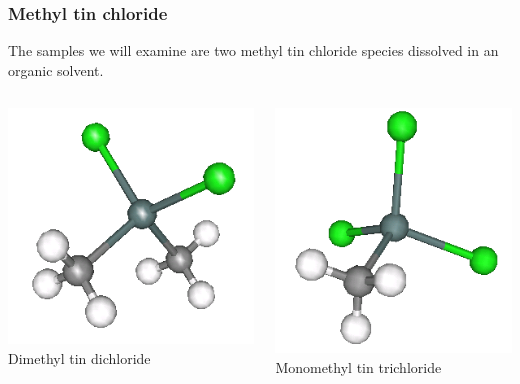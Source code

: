 \documentclass[10pt, xcolor=x11names, compress]{beamer}
\begin{document}
\begin{frame}
  \frametitle{Methyl tin chloride}
  The samples we will examine are two methyl tin chloride species
  dissolved in an organic solvent.

  \begin{columns}
    \begin{column}{0.5\linewidth}
      \begin{center}
        \includegraphics[width=0.5\linewidth]{../noxtal/images/dimethyltin_dichloride.png}\\
      Dimethyl tin dichloride
      \end{center}
    \end{column}
    \begin{column}{0.5\linewidth}
      \begin{center}
        \includegraphics[width=0.5\linewidth]{../noxtal/images/monomethyltin_trichloride.png}\\
        Monomethyl tin trichloride
      \end{center}
    \end{column}
  \end{columns}
  \begin{columns}
    \begin{column}{0.33\linewidth}

\end{column}
\end{columns}
\end{frame}
\end{document}
